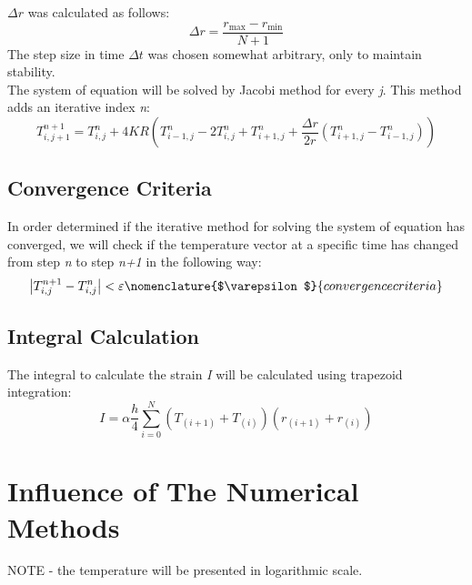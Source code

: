 \documentclass[11pt, a4paper]{article}
\begin{document}
\noindent $\Delta r$ was calculated as follows:
\begin{equation}
    \Delta r=\frac{r_\text{max}-r_\text{min}}{N+1}
\end{equation}
The step size in time $\Delta t$ was chosen somewhat arbitrary, only to maintain stability.\\

\noindent The system of equation will be solved by Jacobi method for every \emph{j}. This method adds an iterative index \emph{n}:
\begin{equation}
    \displaystyle T_{i,j+1}^{n+1}=T_{i,j}^n+4KR\left(T_{i-1,j}^n-2T_{i,j}^n+T_{i+1,j}^n+\frac{\Delta r}{2r}\left(T_{i+1,j}^n-T_{i-1,j}^n\right)\right)
\end{equation}

\subsection{Convergence Criteria}
In order determined if the iterative method for solving the system of equation has converged, we will check if the temperature vector at a specific time has changed from step \emph{n} to step \emph{n+1} in the following way:
\begin{equation}
    \left|T_{i,j}^{n+1}-T_{i,j}^n\right|<\varepsilon
    \nomenclature{$\varepsilon$}{convergence criteria}
\end{equation}

\subsection{Integral Calculation}
The integral to calculate the strain \emph{I} will be calculated using trapezoid integration:
\begin{equation}
    I=\alpha\frac{h}{4}\sum_{i=0}^{N}{\left(T_{\left(i+1\right)}+T_{\left(i\right)}\right)\left(r_{\left(i+1\right)}+r_{\left(i\right)}\right)}
\end{equation}

\section{Influence of The Numerical Methods}
NOTE - the temperature will be presented in logarithmic scale.
\end{document}
